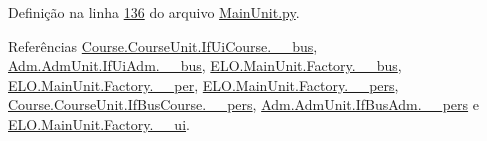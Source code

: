 Definição na linha \hyperlink{MainUnit_8py_source_l00136}{136} do arquivo \hyperlink{MainUnit_8py_source}{Main\-Unit.\-py}.



Referências \hyperlink{CourseUnit_8py_source_l00025}{Course.\-Course\-Unit.\-If\-Ui\-Course.\-\_\-\-\_\-bus}, \hyperlink{AdmUnit_8py_source_l00031}{Adm.\-Adm\-Unit.\-If\-Ui\-Adm.\-\_\-\-\_\-bus}, \hyperlink{MainUnit_8py_source_l00038}{E\-L\-O.\-Main\-Unit.\-Factory.\-\_\-\-\_\-bus}, \hyperlink{MainUnit_8py_source_l00139}{E\-L\-O.\-Main\-Unit.\-Factory.\-\_\-\-\_\-per}, \hyperlink{MainUnit_8py_source_l00039}{E\-L\-O.\-Main\-Unit.\-Factory.\-\_\-\-\_\-pers}, \hyperlink{CourseUnit_8py_source_l00051}{Course.\-Course\-Unit.\-If\-Bus\-Course.\-\_\-\-\_\-pers}, \hyperlink{AdmUnit_8py_source_l00061}{Adm.\-Adm\-Unit.\-If\-Bus\-Adm.\-\_\-\-\_\-pers} e \hyperlink{MainUnit_8py_source_l00037}{E\-L\-O.\-Main\-Unit.\-Factory.\-\_\-\-\_\-ui}.



